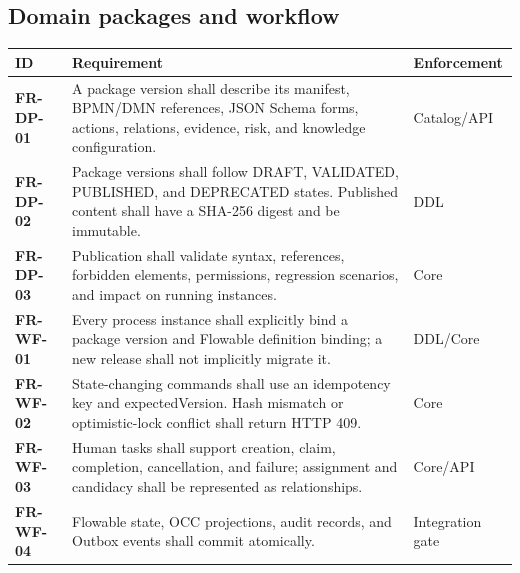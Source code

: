 \documentclass[journal,a4paper,onecolumn]{IEEEtran}
\newcommand{\req}[1]{\textbf{#1}}
\begin{document}
\subsection{Domain packages and workflow}
\begin{longtable}{p{}p{}p{}}
\toprule
ID & Requirement & Enforcement \\
\midrule
\endhead
\req{FR-DP-01} & A package version shall describe its manifest, BPMN/DMN references, JSON Schema forms, actions, relations, evidence, risk, and knowledge configuration. & Catalog/API\\
\req{FR-DP-02} & Package versions shall follow DRAFT, VALIDATED, PUBLISHED, and DEPRECATED states. Published content shall have a SHA-256 digest and be immutable. & DDL\\
\req{FR-DP-03} & Publication shall validate syntax, references, forbidden elements, permissions, regression scenarios, and impact on running instances. & Core\\
\req{FR-WF-01} & Every process instance shall explicitly bind a package version and Flowable definition binding; a new release shall not implicitly migrate it. & DDL/Core\\
\req{FR-WF-02} & State-changing commands shall use an idempotency key and expectedVersion. Hash mismatch or optimistic-lock conflict shall return HTTP 409. & Core\\
\req{FR-WF-03} & Human tasks shall support creation, claim, completion, cancellation, and failure; assignment and candidacy shall be represented as relationships. & Core/API\\
\req{FR-WF-04} & Flowable state, OCC projections, audit records, and Outbox events shall commit atomically. & Integration gate\\
\bottomrule
\end{longtable}
\end{document}
